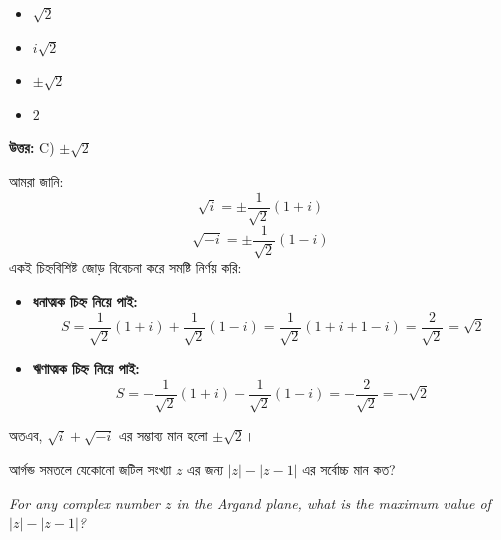 \documentclass[12pt, a4paper]{article}
\begin{document}
\begin{itemize}[label={}, leftmargin=1cm, itemsep=0.5em]
    \item[\textbf{A)}] $\sqrt{2}$
    \item[\textbf{B)}] $i\sqrt{2}$
    \item[\textbf{C)}] $\pm \sqrt{2}$
    \item[\textbf{D)}] $2$
\end{itemize}

\vspace{0.5em}
\begin{tcolorbox}[answerbox]
    \textbf{\color{success} উত্তর:} C) $\pm \sqrt{2}$
\end{tcolorbox}
\vspace{1em}

\begin{tcolorbox}[solutionbox={সমাধান (Solution)}]
    \noindent
    আমরা জানি:
    \[ \sqrt{i} = \pm \frac{1}{\sqrt{2}}(1+i) \]
    \[ \sqrt{-i} = \pm \frac{1}{\sqrt{2}}(1-i) \]
    একই চিহ্নবিশিষ্ট জোড় বিবেচনা করে সমষ্টি নির্ণয় করি:
    \begin{itemize}
        \item \textbf{ধনাত্মক চিহ্ন নিয়ে পাই:} 
        \[ S = \frac{1}{\sqrt{2}}(1+i) + \frac{1}{\sqrt{2}}(1-i) = \frac{1}{\sqrt{2}}(1 + i + 1 - i) = \frac{2}{\sqrt{2}} = \sqrt{2} \]
        \item \textbf{ঋণাত্মক চিহ্ন নিয়ে পাই:} 
        \[ S = -\frac{1}{\sqrt{2}}(1+i) - \frac{1}{\sqrt{2}}(1-i) = -\frac{2}{\sqrt{2}} = -\sqrt{2} \]
    \end{itemize}
    অতএব, $\sqrt{i} + \sqrt{-i}$ এর সম্ভাব্য মান হলো $\pm \sqrt{2}$।
\end{tcolorbox}
\begin{tcolorbox}[questionbox={প্রশ্ন (Question) 11}]
    \noindent
    আর্গন্ড সমতলে যেকোনো জটিল সংখ্যা $z$ এর জন্য $|z| - |z-1|$ এর সর্বোচ্চ মান কত?
    
    \vspace{0.8em}
    \begin{english}
    \noindent\textit{\color{darkgray}
    For any complex number $z$ in the Argand plane, what is the maximum value of $|z| - |z-1|$?
    }
    \end{english}
\end{tcolorbox}
\end{document}
